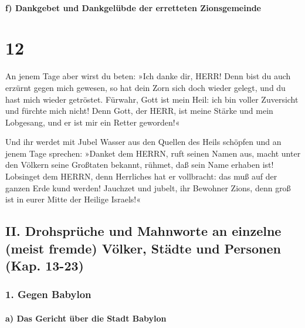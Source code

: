 \hypertarget{f-dankgebet-und-dankgeluxfcbde-der-erretteten-zionsgemeinde}{%
\paragraph{f) Dankgebet und Dankgelübde der erretteten
Zionsgemeinde}\label{f-dankgebet-und-dankgeluxfcbde-der-erretteten-zionsgemeinde}}

\hypertarget{section-11}{%
\section{12}\label{section-11}}

An jenem Tage aber wirst du beten: »Ich danke dir, HERR!
Denn bist du auch erzürnt gegen mich gewesen, so hat dein Zorn sich doch
wieder gelegt, und du hast mich wieder getröstet. Fürwahr,
Gott ist mein Heil: ich bin voller Zuversicht und fürchte mich nicht!
Denn Gott, der HERR, ist meine Stärke und mein Lobgesang, und er ist mir
ein Retter geworden!«

Und ihr werdet mit Jubel Wasser aus den Quellen des Heils
schöpfen und an jenem Tage sprechen: »Danket dem HERRN,
ruft seinen Namen aus, macht unter den Völkern seine Großtaten bekannt,
rühmet, daß sein Name erhaben ist! Lobsinget dem HERRN,
denn Herrliches hat er vollbracht: das muß auf der ganzen Erde kund
werden! Jauchzet und jubelt, ihr Bewohner Zions, denn groß
ist in eurer Mitte der Heilige Israels!«

\hypertarget{ii.-drohspruxfcche-und-mahnworte-an-einzelne-meist-fremde-vuxf6lker-stuxe4dte-und-personen-kap.-13-23}{%
\subsection{II. Drohsprüche und Mahnworte an einzelne (meist fremde)
Völker, Städte und Personen (Kap.
13-23)}\label{ii.-drohspruxfcche-und-mahnworte-an-einzelne-meist-fremde-vuxf6lker-stuxe4dte-und-personen-kap.-13-23}}

\hypertarget{gegen-babylon}{%
\subsubsection{1. Gegen Babylon}\label{gegen-babylon}}

\hypertarget{a-das-gericht-uxfcber-die-stadt-babylon}{%
\paragraph{a) Das Gericht über die Stadt
Babylon}\label{a-das-gericht-uxfcber-die-stadt-babylon}}

